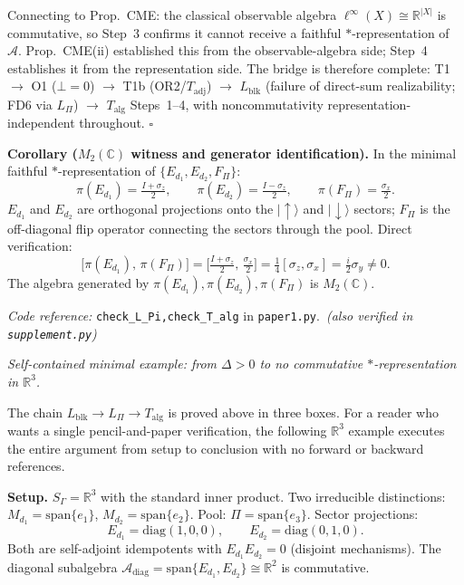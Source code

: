\documentclass[11pt]{article}
\theoremstyle{remark}
\newcommand{\coderef}[2]{\smallskip\noindent\textit{Code reference:} \texttt{#1} in \texttt{#2}.}
\begin{document}
\begin{tcolorbox}[apfbox, title={Theorem $T_{\mathrm{alg}}$ (Enforcement Algebra is Non-Commutative)}]
Connecting to Prop.~CME: the classical observable algebra $\ell^\infty(X) \cong \mathbb{R}^{|X|}$ is commutative, so Step~3 confirms it cannot receive a faithful $*$-representation of $\mathcal{A}$.  Prop.~CME(ii) established this from the observable-algebra side; Step~4 establishes it from the representation side.  The bridge is therefore complete: T1 $\to$ O1 ($\bot=0$) $\to$ T1b (OR2/$T_{\mathrm{adj}}$) $\to$ $L_{\mathrm{blk}}$ (failure of direct-sum realizability; FD6 via $L_\Pi$) $\to$ $T_{\mathrm{alg}}$ Steps~1--4, with noncommutativity representation-independent throughout.  \hfill$\square$

\smallskip\noindent\textbf{Corollary ($M_2(\mathbb{C})$ witness and generator identification).}\label{cor:T_alg}
In the minimal faithful $*$-representation of $\{E_{d_1}, E_{d_2}, F_\Pi\}$:
\[
\pi(E_{d_1}) = \tfrac{I+\sigma_z}{2}, \qquad
\pi(E_{d_2}) = \tfrac{I-\sigma_z}{2}, \qquad
\pi(F_\Pi) = \tfrac{\sigma_x}{2}.
\]
$E_{d_1}$ and $E_{d_2}$ are orthogonal projections onto the $|\!\uparrow\rangle$ and $|\!\downarrow\rangle$ sectors; $F_\Pi$ is the off-diagonal flip operator connecting the sectors through the pool.  Direct verification:
\[
\bigl[\pi(E_{d_1}),\, \pi(F_\Pi)\bigr]
= \bigl[\tfrac{I+\sigma_z}{2},\, \tfrac{\sigma_x}{2}\bigr]
= \tfrac{1}{4}[\sigma_z,\sigma_x] = \tfrac{i}{2}\sigma_y \ne 0.
\]
The algebra generated by $\pi(E_{d_1}), \pi(E_{d_2}), \pi(F_\Pi)$ is $M_2(\mathbb{C})$.

\coderef{check\_L\_Pi,\;check\_T\_alg}{paper1.py}\,%
\hspace{1em}\textit{(also verified in \texttt{supplement.py})}
\end{tcolorbox}

\smallskip\noindent\textit{Self-contained minimal example: from $\Delta > 0$ to no commutative $*$-representation in $\mathbb{R}^3$.}

The chain $L_{\mathrm{blk}} \to L_\Pi \to T_{\mathrm{alg}}$ is proved above in three boxes.  For a reader who wants a single pencil-and-paper verification, the following $\mathbb{R}^3$ example executes the entire argument from setup to conclusion with no forward or backward references.

\smallskip\noindent\textbf{Setup.}  $S_\Gamma = \mathbb{R}^3$ with the standard inner product.  Two irreducible distinctions: $M_{d_1} = \mathrm{span}\{e_1\}$, $M_{d_2} = \mathrm{span}\{e_2\}$.  Pool: $\Pi = \mathrm{span}\{e_3\}$.  Sector projections:
\[
E_{d_1} = \mathrm{diag}(1,0,0), \qquad E_{d_2} = \mathrm{diag}(0,1,0).
\]
Both are self-adjoint idempotents with $E_{d_1}E_{d_2} = 0$ (disjoint mechanisms).  The diagonal subalgebra $\mathcal{A}_{\mathrm{diag}} = \mathrm{span}\{E_{d_1}, E_{d_2}\} \cong \mathbb{R}^2$ is commutative.
\end{document}
